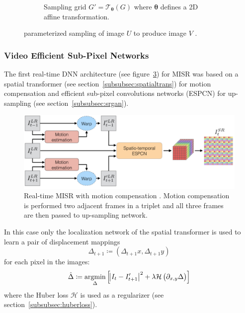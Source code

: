 \begin{figure}[!htbp]
\begin{subfigure}[b]{.39\textwidth}
        \caption{Sampling grid \(G' = \mathcal{T}_{\bm{\theta}}(G)\) where \(\bm{\theta}\) defines a 2D affine transformation.}\label{subfig:spacetransformer_ttheta}
    \end{subfigure}
    \caption{parameterized sampling of image \(U\) to produce image \(V\) \cite{jaderberg2015spatial}.}\label{fig:paramsampling}
\end{figure}


\subsubsection{Video Efficient Sub-Pixel Networks}



The first real-time DNN architecture (see figure~\ref{fig:realtimeepscn}) for MISR was based on a spatial transformer (see section~\ref{subsubsec:spatialtrans}) for motion compensation and efficient sub-pixel convolutions networks (ESPCN) for up-sampling (see section~\ref{subsubsec:srgan}).
\begin{figure}[!htbp]
    \includegraphics[width=\textwidth]{figures/neural_networks/realtime_epscn.png}
    \caption{Real-time MISR with motion compensation \cite{caballero2017real}. Motion compensation is performed two adjacent frames in a triplet and all three frames are then passed to up-sampling network.}\label{fig:realtimeepscn}
\end{figure}
%
In this case only the localization network of the spatial transformer is used to learn a pair of displacement mappings 
\begin{equation}
    \Delta_{t+1} \coloneqq (\Delta_{t+1}x, \Delta_{t+1} y)
\end{equation}
for each pixel in the images:
\begin{equation}
    \hat{\Delta} \coloneqq \underset{\Delta}{\text{argmin}}\left[\abs{I_t - I'_{t+1}}^2 + \lambda \mathcal{H}\left( \partial_{x,y} \Delta\right)\right]
\end{equation}
where the Huber loss \(\mathcal{H}\) is used as a regularizer (see section~\ref{subsubsec:huberloss}).
